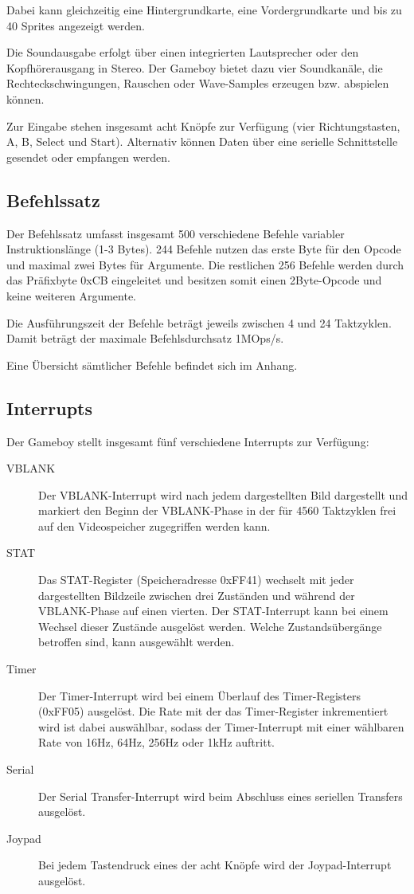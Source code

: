\documentclass[a4paper]{scrartcl}
\begin{document}
Dabei kann gleichzeitig eine Hintergrundkarte, eine Vordergrundkarte und bis zu 40 Sprites angezeigt werden.

Die Soundausgabe erfolgt über einen integrierten Lautsprecher oder den Kopfhörerausgang in Stereo. Der Gameboy bietet dazu vier Soundkanäle, die Rechteckschwingungen, Rauschen oder Wave-Samples erzeugen bzw. abspielen können.

Zur Eingabe stehen insgesamt acht Knöpfe zur Verfügung (vier Richtungstasten, A, B, Select und Start). Alternativ können Daten über eine serielle Schnittstelle gesendet oder empfangen werden.
\subsection{Befehlssatz}

Der Befehlssatz umfasst insgesamt 500 verschiedene Befehle variabler Instruktionslänge (1-3 Bytes). 244 Befehle nutzen das erste Byte für den Opcode und maximal zwei Bytes für Argumente. Die restlichen 256 Befehle werden durch das Präfixbyte 0xCB eingeleitet und besitzen somit einen 2Byte-Opcode und keine weiteren Argumente.

Die Ausführungszeit der Befehle beträgt jeweils zwischen 4 und 24 Taktzyklen. Damit beträgt der maximale Befehlsdurchsatz 1MOps/s.

Eine Übersicht sämtlicher Befehle befindet sich im Anhang.

\subsection{Interrupts}

Der Gameboy stellt insgesamt fünf verschiedene Interrupts zur Verfügung:

\begin{description}
\item[VBLANK]
Der VBLANK-Interrupt wird nach jedem dargestellten Bild dargestellt und markiert den Beginn der VBLANK-Phase in der für 4560 Taktzyklen frei auf den Videospeicher zugegriffen werden kann.
\item[STAT]
Das STAT-Register (Speicheradresse 0xFF41) wechselt mit jeder dargestellten Bildzeile zwischen drei Zuständen und während der VBLANK-Phase auf einen vierten. Der STAT-Interrupt kann bei einem Wechsel dieser Zustände ausgelöst werden. Welche Zustandsübergänge betroffen sind, kann ausgewählt werden.
\item[Timer]
Der Timer-Interrupt wird bei einem Überlauf des Timer-Registers (0xFF05) ausgelöst. Die Rate mit der das Timer-Register inkrementiert wird ist dabei auswählbar, sodass der Timer-Interrupt mit einer wählbaren Rate von 16Hz, 64Hz, 256Hz oder 1kHz auftritt.
\item[Serial]
Der Serial Transfer-Interrupt wird beim Abschluss eines seriellen Transfers ausgelöst.
\item[Joypad]
Bei jedem Tastendruck eines der acht Knöpfe wird der Joypad-Interrupt ausgelöst.
\end{description}
\end{document}

